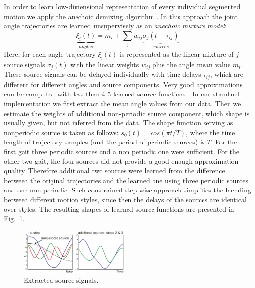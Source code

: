 In order to learn low-dimensional representation of every individual segmented motion we apply the anechoic demixing algorithm \cite{ref:og11, ref:caeg13}.
In this approach the joint angle trajectories are learned unsupervisely as an \emph{anechoic mixture model}: \newline
\begin{displaymath}
\underbrace{\xi_{i}(t)}_{angles}=m_i+\sum_{j}w_{ij}\underbrace{\sigma_{j}\left(t-\tau_{ij}\right)}_{sources}
\end{displaymath}
Here, for each angle trajectory $\xi_{i}(t)$ is represented as the linear mixture of $j$ source signals $\sigma_{j}(t)$ with the linear weights $w_{ij}$
plus the angle mean value $m_i$. 
These source signals can be delayed individually with time delays $\tau_{ij}$, which are different for different angles and source components.
Very good approximations can be computed with less than 4-5 learned source functions \cite{ref:gie09}.
In our standard implementation we first extract the mean angle values from our data.
Then we estimate the weights of additional non-periodic source component, which shape is usually given, but not inferred from the data. 
The shape function serving as nonperiodic source is taken as follows: $s_0(t)=cos(\pi t/T)$, where the time length of trajectory samples (and the period of periodic sources) is $T$.
For the first gait three periodic sources and a non periodic one were sufficient.
For the other two gait, the four sources did not provide a good enough approximation quality.
Therefore additional two sources were learned from the difference between the original trajectories and the learned one using three periodic sources and one non periodic.
Such constrained step-wise approach simplifies the blending between different motion styles, since then the delays of the sources are identical over styles.
The resulting shapes of learned source functions are presented in Fig.~\ref{fig:Sources}.

\begin{figure}[ht]
  \centering
  \includegraphics[width=0.48\textwidth]{sources4p2h.pdf}
  \caption{Extracted source signals.}
\label{fig:Sources}
\end{figure}

